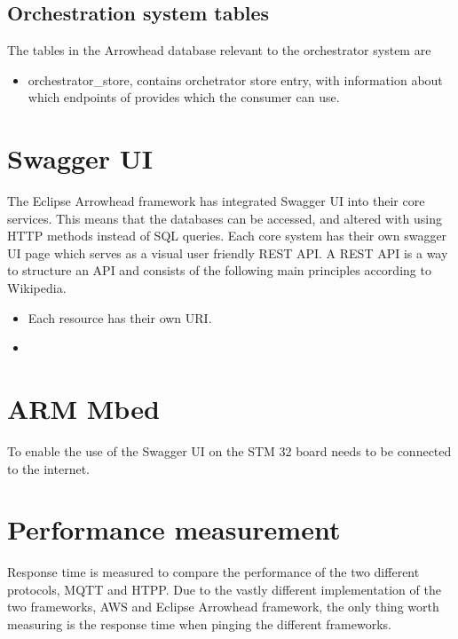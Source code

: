 \subsection{Orchestration system tables}
The tables in the Arrowhead database relevant to the orchestrator system are
\begin{itemize}
    \item orchestrator\_store,  contains orchetrator store entry, with information about which endpoints of provides which the consumer can use.
\end{itemize}

\section{Swagger UI}
The Eclipse Arrowhead framework has integrated Swagger UI into their core services. 
This means that the databases can be accessed, and altered with using HTTP methods instead of SQL queries.
Each core system has their own swagger UI page which serves as a visual user friendly REST API. 
A REST API is a way to structure an API and consists of the following main principles according to Wikipedia.
\begin{itemize}
    \item Each resource has their own URI.
    \item  
\end{itemize}



\section{ARM Mbed}
To enable the use of the Swagger UI on the STM 32 board needs to be connected to the internet. 


\section{Performance measurement}
Response time is measured to compare the performance of the two different protocols, MQTT and HTPP. 
Due to the vastly different implementation of the two frameworks, AWS and Eclipse Arrowhead framework, the only thing worth measuring is the response time when pinging the different frameworks.


 

